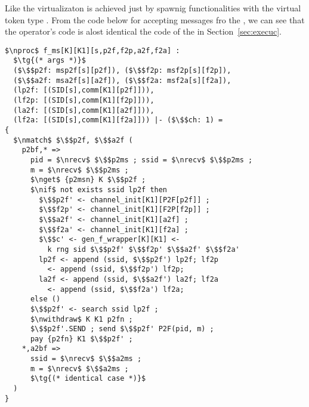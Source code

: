 Like the \partywrapper virtualizaton is achieved just by spawnig functionalities with the virtual token type .
From the code below for accepting messages fro the \partywrapper, we can see that the operator's code is alost identical the code of the \partywrapper in Section~\ref{sec:execuc}.
\begin{lstlisting}[basicstyle=\footnotesize\BeraMonottFamily, frame=single, mathescape]
$\nproc$ f_ms[K][K1][s,p2f,f2p,a2f,f2a] :
  $\tg{(* args *)}$
  ($\$$p2f: msp2f[s][p2f]), ($\$$f2p: msf2p[s][f2p]),
  ($\$$a2f: msa2f[s][a2f]), ($\$$f2a: msf2a[s][f2a]),
  (lp2f: [(SID[s],comm[K1][p2f]])), 
  (lf2p: [(SID[s],comm[K1][f2p]])), 
  (la2f: [(SID[s],comm[K1][a2f]])), 
  (lf2a: [(SID[s],comm[K1][f2a]])) |- ($\$$ch: 1) =
{
  $\nmatch$ $\$$p2f, $\$$a2f (
    p2bf,* =>
      pid = $\nrecv$ $\$$p2ms ; ssid = $\nrecv$ $\$$p2ms ;
      m = $\nrecv$ $\$$p2ms ;
      $\nget$ {p2msn} K $\$$p2f ;
      $\nif$ not exists ssid lp2f then
        $\$$p2f' <- channel_init[K1][P2F[p2f]] ;
        $\$$f2p' <- channel_init[K1][F2P[f2p]] ;
        $\$$a2f' <- channel_init[K1][a2f] ;
        $\$$f2a' <- channel_init[K1][f2a] ;
        $\$$c' <- gen_f_wrapper[K][K1] <- 
          k rng sid $\$$p2f' $\$$f2p' $\$$a2f' $\$$f2a'
        lp2f <- append (ssid, $\$$p2f') lp2f; lf2p 
          <- append (ssid, $\$$f2p') lf2p;
        la2f <- append (ssid, $\$$a2f') la2f; lf2a 
          <- append (ssid, $\$$f2a') lf2a;
      else ()
      $\$$p2f' <- search ssid lp2f ;
      $\nwithdraw$ K K1 p2fn ;
      $\$$p2f'.SEND ; send $\$$p2f' P2F(pid, m) ; 
      pay {p2fn} K1 $\$$p2f' ;
    *,a2bf => 
      ssid = $\nrecv$ $\$$a2ms ;
      m = $\nrecv$ $\$$a2ms ;
      $\tg{(* identical case *)}$
  )
} 
\end{lstlisting}

